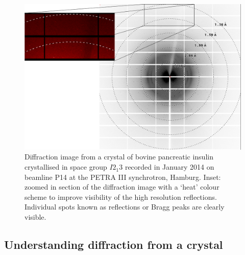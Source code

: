         \begin{figure}
            \centering
            \includegraphics[width=1\textwidth]{figures/introduction/InsulinDiffractionImage.pdf}
            \caption[Insulin diffraction image.]{Diffraction image from a crystal of bovine pancreatic insulin crystallised in space group $I2_1 3$ recorded in January 2014 on beamline P14 at the PETRA III synchrotron, Hamburg.
            Inset: zoomed in section of the diffraction image with a `heat' colour scheme to improve visibility of the high resolution reflections.
            Individual spots known as reflections or Bragg peaks are clearly visible.}
            \label{fig:Insulin diffraction image}
        \end{figure}

    \subsection{Understanding diffraction from a crystal}
    \label{sub:Understanding diffraction from a crystal}

